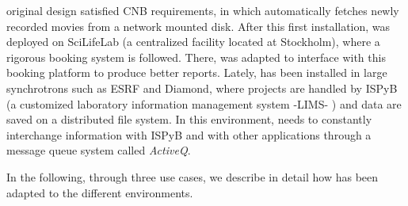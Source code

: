 \scipion original design satisfied CNB requirements, in which \scipion automatically fetches newly recorded movies from a network mounted disk. After this first installation, \scipion was deployed on SciLifeLab (a centralized facility located at Stockholm), where a rigorous booking system is followed. There, \scipion was adapted to interface with this booking platform to produce better reports. Lately,  \scipion has been installed in  large synchrotrons  such as ESRF and Diamond,  where projects are handled by ISPyB (a customized laboratory information management system -LIMS- \citep{Delageniere2011:ispb}) and data are saved on a distributed file system. %
In this environment, \scipion needs to constantly interchange information with ISPyB and with other applications through a message queue system called \emph{ActiveQ}.%

In the following, through three use cases, we describe in detail how \scipion has been adapted to the different environments.









